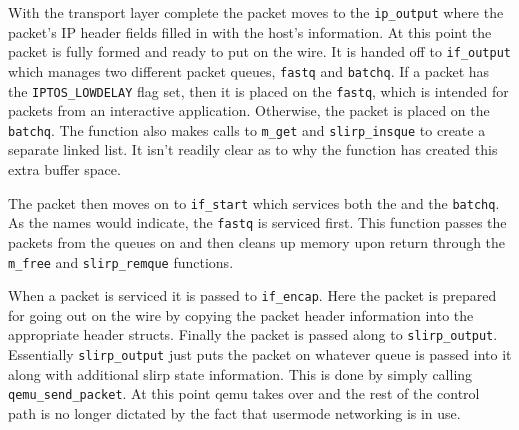 With the transport layer complete the packet moves to the \texttt{ip_output} where the packet's IP header fields filled in with the host's information.
At this point the packet is fully formed and ready to put on the wire.
It is handed off to \texttt{if_output} which manages two different packet queues, \texttt{fastq} and \texttt{batchq}.
If a packet has the \texttt{IPTOS_LOWDELAY} flag set, then it is placed on the \texttt{fastq}, which is intended for packets from an interactive application.
Otherwise, the packet is placed on the \texttt{batchq}.
The function also makes calls to \texttt{m_get} and \texttt{slirp_insque} to create a separate linked list.
It isn't readily clear as to why the function has created this extra buffer space.

The packet then moves on to \texttt{if_start} which services both the  and the \texttt{batchq}.
As the names would indicate, the \texttt{fastq} is serviced first.
This function passes the packets from the queues on and then cleans up memory upon return through the \texttt{m_free} and \texttt{slirp_remque} functions.

When a packet is serviced it is passed to \texttt{if_encap}.
Here the packet is prepared for going out on the wire by copying the packet header information into the appropriate header structs.
Finally the packet is passed along to \texttt{slirp_output}. 
Essentially \texttt{slirp_output} just puts the packet on whatever queue is passed into it along with additional slirp state information.
This is done by simply calling \texttt{qemu_send_packet}.
At this point qemu takes over and the rest of the control path is no longer dictated by the fact that usermode networking is in use.

